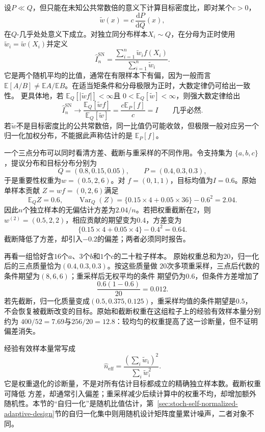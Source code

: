 设\(P\ll Q\)，但只能在未知公共常数倍的意义下计算目标密度比，即对某个\(c>0\)，
\[
  \widetilde{w}(x)
  =
  c\,\frac{\mathrm{d}P}{\mathrm{d}Q}(x),
\]
在\(Q\)-几乎处处意义下成立。对独立同分布样本\(X_i\sim Q\)，在分母为正时使用
\(\widetilde{w}_i=\widetilde{w}(X_i)\)并定义
\begin{equation}
  \widehat{I}^{\mathrm{SN}}_n
  =
  \frac{\sum_{i=1}^{n}\widetilde{w}_if(X_i)}
       {\sum_{i=1}^{n}\widetilde{w}_i}.
  \label{eq:probability-self-normalized-importance-sampling}
\end{equation}
它是两个随机平均的比值，通常在有限样本下有偏，因为一般而言\(\mathbb{E}[A/B]\neq\mathbb{E}A/\mathbb{E}B\)。在适当矩条件和分母极限为正时，大数定律仍可给出一致性。
更具体地，若
\(\mathbb{E}_Q[|\widetilde{w}f|]<\infty\)且
\(0<\mathbb{E}_Q[\widetilde{w}]<\infty\)，则强大数定律给出
\[
  \widehat{I}^{\mathrm{SN}}_n
  \longrightarrow
  \frac{\mathbb{E}_Q[\widetilde{w}f]}
       {\mathbb{E}_Q[\widetilde{w}]}
  =
  \frac{c\mathbb{E}_P[f]}{c}
  =I
  \qquad\text{几乎必然}.
\]
若\(\widetilde{w}\)不是目标密度比的公共常数倍，同一比值仍可能收敛，但极限一般对应另一个归一化加权分布，不能据此声称估计的是
\(\mathbb{E}_P[f]\)。

一个三点分布可以同时看清方差、截断与重采样的不同作用。令支持集为
\(\{a,b,c\}\)，提议分布和目标分布分别为
\[
  Q=(0.8,0.15,0.05),\qquad
  P=(0.4,0.3,0.3),
\]
于是重要性权重为\(w=(0.5,2,6)\)。对
\(f=(0,1,1)\)，目标均值为\(I=0.6\)。原始单样本贡献
\(Z=wf=(0,2,6)\)满足
\[
  \mathbb{E}_Q Z=0.6,\qquad
  \operatorname{Var}_Q(Z)
  =\{0.15\times4+0.05\times36\}-0.6^2
  =2.04.
\]
因此\(n\)个独立样本的无偏估计方差为\(2.04/n\)。若把权重截断在\(2\)，则
\(w^{(2)}=(0.5,2,2)\)，相应贡献的期望变为\(0.4\)，方差变为
\[
  \{0.15\times4+0.05\times4\}-0.4^2=0.64.
\]
截断降低了方差，却引入\(-0.2\)的偏差；两者必须同时报告。

再看一组恰好含\(16\)个\(a\)、\(3\)个\(b\)和\(1\)个\(c\)的二十粒子样本。
原始权重总和为\(20\)，归一化后的三点质量恰为\((0.4,0.3,0.3)\)。按这些质量做
\(20\)次多项重采样，三点后代数的条件期望为\((8,6,6)\)；重采样后无权平均的条件
期望仍为\(0.6\)，但条件方差增加了
\[
  \frac{0.6(1-0.6)}{20}=0.012.
\]
若先截断，归一化质量变成\((0.5,0.375,0.125)\)，重采样均值的条件期望是\(0.5\)，
不会恢复被截断改变的目标。原始和截断权重在这组粒子上的经验有效样本量分别约为
\(400/52=7.69\)与\(256/20=12.8\)：较均匀的权重提高了这一诊断量，但不证明偏差消失。

经验有效样本量常写成
\[ \widehat{n}_{\mathrm{eff}}
  =\frac{(\sum_i\widetilde{w}_i)^2}{\sum_i\widetilde{w}_i^2}. \]
它是权重退化的诊断量，不是对所有估计目标都成立的精确独立样本数。截断权重可降低
方差，却通常引入偏差；重采样减少后续计算中的权重不均，却增加额外随机性。本节的“自归一化”是随机比值估计，第~\ref{sec:stoch-self-normalized-adaptive-design}节的自归一化集中则用随机设计矩阵度量累计噪声，二者对象不同。

